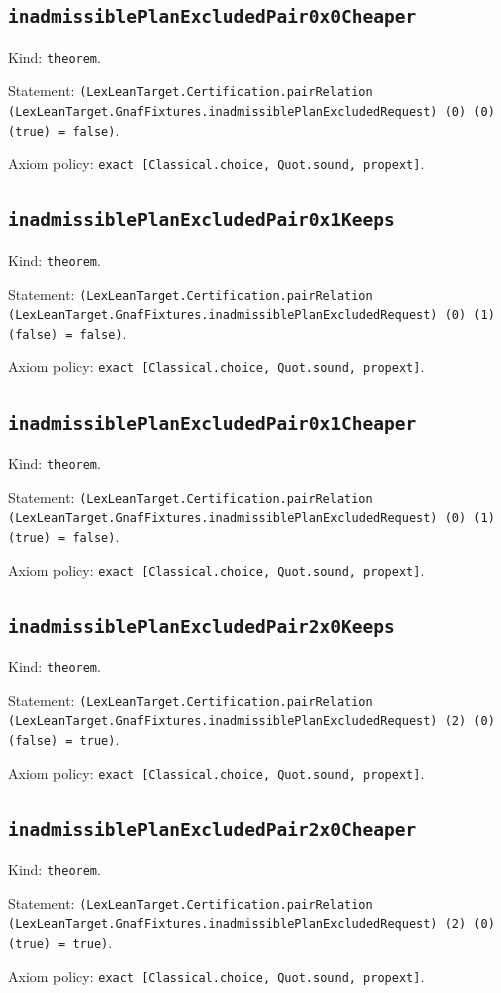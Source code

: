\documentclass[11pt]{article}
\begin{document}
\subsection*{\texttt{inadmissiblePlanExcludedPair0x0Cheaper}}
\noindent Kind: \texttt{theorem}.\par
\noindent Statement: \texttt{(LexLeanTarget.Certification.pairRelation (LexLeanTarget.GnafFixtures.inadmissiblePlanExcludedRequest) (0) (0) (true) = false)}.\par
\noindent Axiom policy: \texttt{exact [Classical.choice, Quot.sound, propext]}.\par
\subsection*{\texttt{inadmissiblePlanExcludedPair0x1Keeps}}
\noindent Kind: \texttt{theorem}.\par
\noindent Statement: \texttt{(LexLeanTarget.Certification.pairRelation (LexLeanTarget.GnafFixtures.inadmissiblePlanExcludedRequest) (0) (1) (false) = false)}.\par
\noindent Axiom policy: \texttt{exact [Classical.choice, Quot.sound, propext]}.\par
\subsection*{\texttt{inadmissiblePlanExcludedPair0x1Cheaper}}
\noindent Kind: \texttt{theorem}.\par
\noindent Statement: \texttt{(LexLeanTarget.Certification.pairRelation (LexLeanTarget.GnafFixtures.inadmissiblePlanExcludedRequest) (0) (1) (true) = false)}.\par
\noindent Axiom policy: \texttt{exact [Classical.choice, Quot.sound, propext]}.\par
\subsection*{\texttt{inadmissiblePlanExcludedPair2x0Keeps}}
\noindent Kind: \texttt{theorem}.\par
\noindent Statement: \texttt{(LexLeanTarget.Certification.pairRelation (LexLeanTarget.GnafFixtures.inadmissiblePlanExcludedRequest) (2) (0) (false) = true)}.\par
\noindent Axiom policy: \texttt{exact [Classical.choice, Quot.sound, propext]}.\par
\subsection*{\texttt{inadmissiblePlanExcludedPair2x0Cheaper}}
\noindent Kind: \texttt{theorem}.\par
\noindent Statement: \texttt{(LexLeanTarget.Certification.pairRelation (LexLeanTarget.GnafFixtures.inadmissiblePlanExcludedRequest) (2) (0) (true) = true)}.\par
\noindent Axiom policy: \texttt{exact [Classical.choice, Quot.sound, propext]}.\par
\end{document}
